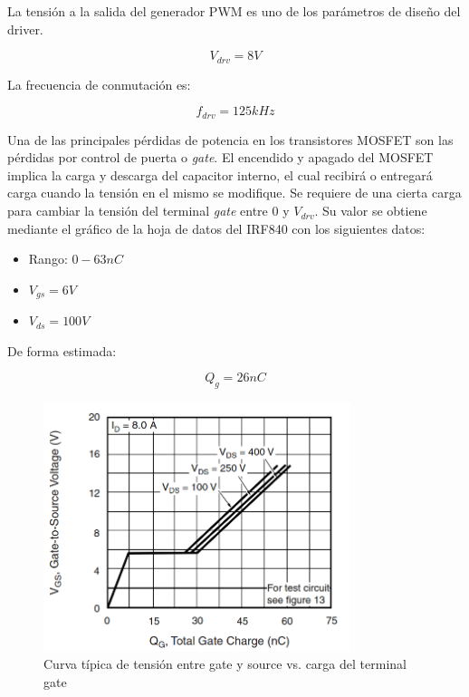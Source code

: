 La tensión a la salida del generador PWM es uno de los parámetros de diseño del driver.

$$ V_{drv}=8V $$

La frecuencia de conmutación es: 

$$ f_{drv}=125kHz $$


Una de las principales pérdidas de potencia en los transistores MOSFET son las pérdidas por control de puerta o \textit{gate}. 
El encendido y apagado del MOSFET implica la carga y descarga del capacitor interno, 
el cual recibirá o entregará carga cuando la tensión en el mismo se modifique. 
Se requiere de una cierta carga para cambiar la tensión del terminal \textit{gate} entre $0$ y $V_{drv}$. 
Su valor se obtiene mediante el gráfico de la hoja de datos del IRF840 con los siguientes datos:

\begin{itemize}
    \item Rango: $0-63nC$
    \item $V_{gs}=6V$
    \item $V_{ds}=100V$
\end{itemize}

De forma estimada: 

$$ Q_g=26nC $$

\begin{figure}[ht]
    \centering
    \includegraphics[width=0.8\textwidth]{images/irf840/vgs-vs-qg.png}
    \caption{Curva típica de tensión entre gate y source vs. carga del terminal gate}
    \label{fig:vgs-vs-qg}
\end{figure}

